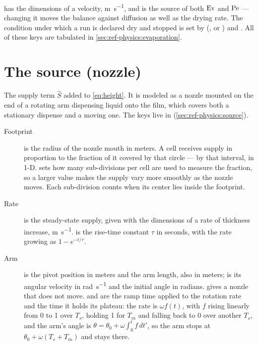  has the dimensions of a velocity,
\si{\metre\per\second}, and is the source of both $\mathrm{Ev}$ and $\mathrm{Pe}$ --- changing
it moves the balance against diffusion as well as the drying rate. The
condition under which a run is declared dry and stopped is set by
 (,  or ) and
. All of these keys are tabulated in
\cref{sec:ref-physics:evaporation}.

\section{The source (nozzle)}
\label{sec:terms:source}

The supply term $\hat{S}$ added to \cref{eq:height}. It is modeled as a nozzle
mounted on the end of a rotating arm dispensing liquid onto the film, which
covers both a stationary dispense and a moving one. The keys live in
 (\cref{sec:ref-physics:source}).

\begin{description}
  \item[Footprint]  is the radius of the nozzle mouth in meters. A
    cell receives supply in proportion to the fraction of it covered by that
    circle --- by that interval, in 1-D.  sets how many
    sub-divisions per cell are used to measure the fraction, so a larger value
    makes the supply vary more smoothly as the nozzle moves. Each
    sub-division counts when its center lies inside the footprint.
  \item[Rate]  is the steady-state supply, given with the
    dimensions of a rate of thickness increase, \si{\metre\per\second}.
     is the rise-time constant $\tau$ in seconds, with the
    rate growing as $1 - e^{-t/\tau}$.
  \item[Arm]  is the pivot position in meters and
     the arm length, also in meters;  is its
    angular velocity in \si{\radian\per\second} and  the
    initial angle in radians.
     gives a nozzle that does not move.  and
     are the ramp time applied to the rotation rate and the time
    it holds its plateau: the rate is $\omega f(t)$, with $f$ rising linearly
    from 0 to 1 over $T_s$, holding 1 for $T_m$ and falling back to 0 over
    another $T_s$, and the arm's angle is
    $\theta = \theta_0 + \omega\int_0^t f\,dt'$, so the arm stops at
    $\theta_0 + \omega(T_s + T_m)$ and stays there.
\end{description}

